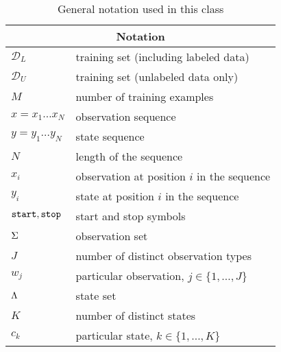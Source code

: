 %

\begin{table}[h]
\begin{center}
\begin{tabular}{|l|l|}
\hline
\multicolumn{2}{|c|}{Notation}\\
\hline
\hline
$\mathcal{D}_L$ & training set (including labeled data)\\
\hline
$\mathcal{D}_U$ & training set (unlabeled data only)\\
\hline
$M$  & number of training examples \\
\hline
$x = x_1 \ldots x_N$  & observation sequence \\
\hline
$y = y_1 \ldots y_N$  & state sequence \\
\hline
$N$  & length of the sequence \\
\hline
$x_i$ &  observation at position $i$ in the sequence\\
\hline
$y_i$ &  state at position $i$ in the sequence\\
\hline
${\tt start}, {\tt stop}$ & start and stop symbols\\
\hline
$\Sigma$ & observation set\\
\hline 
$J$ & number of distinct observation types\\
\hline 
$w_j$ & particular observation, $j \in \{1,\ldots,J\}$\\
\hline 
$\Lambda$ & state set\\
\hline 
$K$ & number of distinct states\\
\hline 
$c_k$ & particular state, $k \in \{1,\ldots,K\}$\\
\hline  
\end{tabular}
\end{center}
\label{tab:hmm_notation}
\caption{General notation used in this class}
\end{table}








